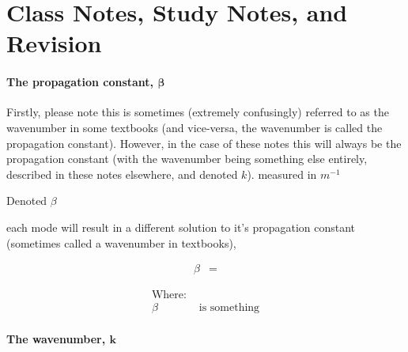 \documentclass[colorlinks,11pt,a4paper,normalphoto,withhyper,ragged2e]{altareport}
\begin{document}
\section{Class Notes, Study Notes, and Revision}







\paragraph{The propagation constant, $\boldsymbol{\beta}$ \linebreak}
Firstly, please note this is sometimes (extremely confusingly) referred to as the wavenumber in some textbooks (and vice-versa, the wavenumber is called the propagation constant). However, in the case of these notes this will always be the propagation constant (with the wavenumber being something else entirely, described in these notes elsewhere, and denoted $k$). measured in $m^{-1}$

Denoted $\beta$ 

each mode will result in a different solution to it's propagation constant (sometimes called a wavenumber in textbooks), 

\begin{paracol}{2}

\medskip

\setlength{\jot}{2ex}
\begin{align}
	\beta &= \nonumber
\end{align}

\switchcolumn

\setlength{\jot}{1ex}
\begin{align}
	\text{Where:}& \nonumber\\
	\beta & \text{ is something} \nonumber
\end{align}

\end{paracol}




\paragraph{The wavenumber, $\textbf{k}$ \linebreak}
\end{document}
